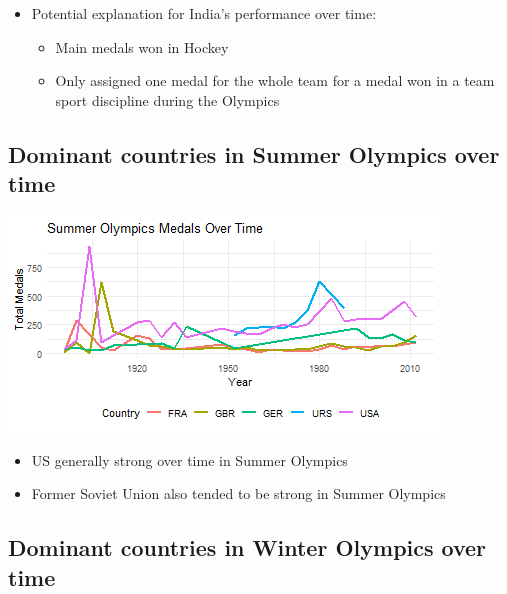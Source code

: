 \documentclass[11pt,preprint, authoryear]{elsarticle}
\let\origfigure\figure
\let\endorigfigure\endfigure
\renewenvironment{figure}[1][2] {
    \expandafter\origfigure\expandafter[H]
} {
    \endorigfigure
}
\numberwithin{equation}{section}
\numberwithin{figure}{section}
\numberwithin{table}{section}
\def\tightlist{} %
\begin{document}
\begin{itemize}
\tightlist
\item
  Potential explanation for India's performance over time:

  \begin{itemize}
  \tightlist
  \item
    Main medals won in Hockey
  \item
    Only assigned one medal for the whole team for a medal won in a team
    sport discipline during the Olympics
  \end{itemize}
\end{itemize}

\hypertarget{dominant-countries-in-summer-olympics-over-time}{%
\subsection{Dominant countries in Summer Olympics over
time}\label{dominant-countries-in-summer-olympics-over-time}}

\begin{figure}[H]

{\centering \includegraphics{Question4_files/figure-latex/Figure2-1} 

}

\caption{Top Countries Summer Olympics \label{Figure2}}\label{fig:Figure2}
\end{figure}

\begin{itemize}
\tightlist
\item
  US generally strong over time in Summer Olympics
\item
  Former Soviet Union also tended to be strong in Summer Olympics
\end{itemize}

\hypertarget{dominant-countries-in-winter-olympics-over-time}{%
\subsection{Dominant countries in Winter Olympics over
time}\label{dominant-countries-in-winter-olympics-over-time}}
\end{document}
